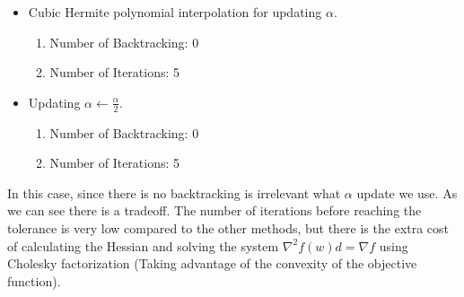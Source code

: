 \documentclass[11pt]{article}
\theoremstyle{plain}
\begin{document}
\begin{itemize}
\item Cubic Hermite polynomial interpolation for updating $\alpha$.
	\begin{enumerate}
	\item Number of Backtracking: 0
	\item Number of Iterations: 5 
	\end{enumerate}

\item Updating $\alpha\leftarrow\frac{\alpha}{2}$.
	\begin{enumerate}
	\item Number of Backtracking: 0
	\item Number of Iterations: 5 
	\end{enumerate}
\end{itemize} 
In this case, since there is no backtracking is irrelevant what $\alpha$ update we use. As we can see there is
a tradeoff. The number of iterations before reaching the tolerance is very low compared to the other methods, but
there is the extra cost of calculating the Hessian and solving the system $\nabla^{2} f(w) d=\nabla f$ using
Cholesky factorization (Taking advantage of the convexity of the objective function).
\end{document}
